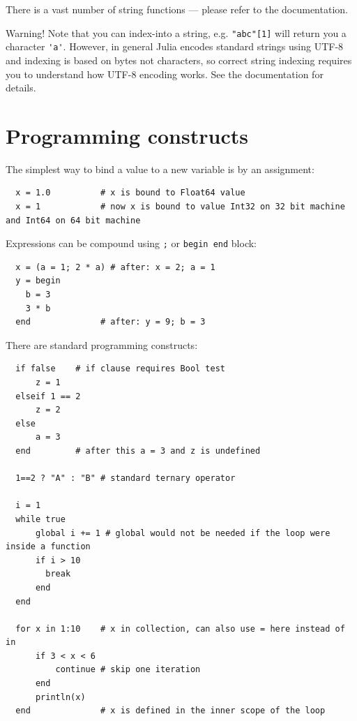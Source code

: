 \documentclass[10pt,a4paper]{article}
\begin{document}
There is a vast number of string functions --- please refer to the documentation.

Warning! Note that you can index-into a string, e.g. \lstinline|"abc"[1]| will return you a character \lstinline|'a'|. However, in general Julia encodes standard strings using UTF-8 and indexing is based on bytes not characters, so correct string indexing requires you to understand how UTF-8 encoding works. See the documentation for details.

\section{Programming constructs}
The simplest way to bind a value to a new variable is by an assignment:
\begin{lstlisting}
  x = 1.0          # x is bound to Float64 value
  x = 1            # now x is bound to value Int32 on 32 bit machine and Int64 on 64 bit machine
\end{lstlisting}

Expressions can be compound using \lstinline|;| or \lstinline|begin end| block:
\begin{lstlisting}
  x = (a = 1; 2 * a) # after: x = 2; a = 1
  y = begin
    b = 3
    3 * b
  end              # after: y = 9; b = 3
\end{lstlisting}

There are standard programming constructs:
\begin{lstlisting}
  if false    # if clause requires Bool test
      z = 1
  elseif 1 == 2
      z = 2
  else
      a = 3
  end         # after this a = 3 and z is undefined

  1==2 ? "A" : "B" # standard ternary operator

  i = 1
  while true
      global i += 1 # global would not be needed if the loop were inside a function
      if i > 10
        break
      end
  end

  for x in 1:10    # x in collection, can also use = here instead of in
      if 3 < x < 6
          continue # skip one iteration
      end
      println(x)
  end              # x is defined in the inner scope of the loop
\end{lstlisting}
\end{document}
